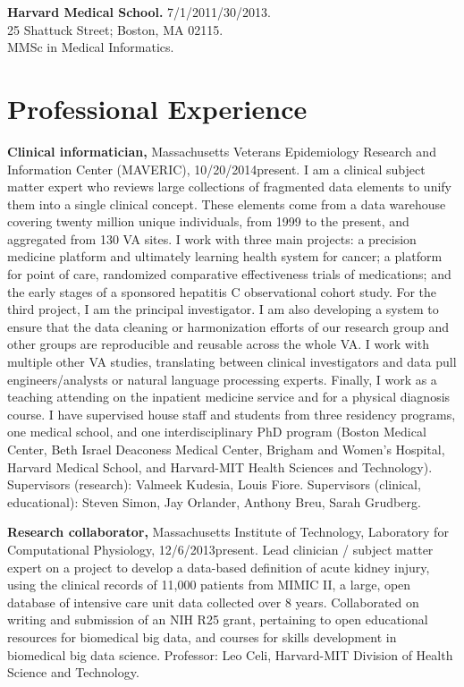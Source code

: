 \documentclass[12pt]{article}
\begin{document}
\textbf{Harvard Medical School.} 7/1/2011/30/2013.\\
25 Shattuck Street; Boston, MA 02115.\\
MMSc in Medical Informatics.

\section*{Professional Experience} %

\textbf{Clinical informatician,} Massachusetts Veterans Epidemiology
Research and Information Center (MAVERIC), 10/20/2014\ndash{}present.
I am a clinical subject matter expert who reviews large collections of
fragmented data elements to unify them into a single clinical concept.
These elements come from a data warehouse covering twenty million
unique individuals, from 1999 to the present, and aggregated from 130
VA sites. I work with three main projects: a precision medicine
platform and ultimately learning health system for cancer; a platform
for point of care, randomized comparative effectiveness trials of
medications; and the early stages of a sponsored hepatitis C
observational cohort study. For the third project, I am the principal
investigator. I am also developing a system to ensure that the data
cleaning or harmonization efforts of our research group and other
groups are reproducible and reusable across the whole VA. I work with
multiple other VA studies, translating between clinical investigators
and data pull engineers/analysts or natural language processing
experts. Finally, I work as a teaching attending on the inpatient
medicine service and for a physical diagnosis course. I have
supervised house staff and students from three residency programs, one
medical school, and one interdisciplinary PhD program (Boston Medical
Center, Beth Israel Deaconess Medical Center, Brigham and Women's
Hospital, Harvard Medical School, and Harvard-MIT Health Sciences and
Technology). Supervisors (research): Valmeek Kudesia, Louis Fiore.
Supervisors (clinical, educational): Steven Simon, Jay Orlander,
Anthony Breu, Sarah Grudberg.

\textbf{Research collaborator,} Massachusetts Institute of Technology,
Laboratory for Computational Physiology, 12/6/2013\ndash{}present.
Lead clinician / subject matter expert on a project to develop a
data-based definition of acute kidney injury, using the clinical
records of 11,000 patients from MIMIC II, a large, open database of
intensive care unit data collected over 8 years. Collaborated on writing and
submission of an NIH R25 grant, pertaining to open educational
resources for biomedical big data, and courses for skills development
in biomedical big data science. Professor: Leo Celi, Harvard-MIT
Division of Health Science and Technology.
\end{document}
